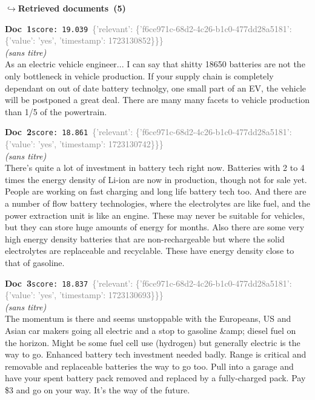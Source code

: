 \documentclass[a4paper,11pt]{article}
\begin{document}
\noindent\hfill{\footnotesize\textcolor{doccolor}{\textbf{$\hookrightarrow$\enspace Retrieved documents~(5)}}}
\begin{docenv}
{\footnotesize\textcolor{doccolor}{\textbf{Doc~1}}}\hfill{\tiny\texttt{score:~19.039}}\ {\tiny\textcolor{gray}{\{'relevant': \{'f6ce971c-68d2-4c26-b1c0-477dd28a5181': \{'value': 'yes', 'timestamp': 1723130852\}\}\}}}\\[3pt]
{\small\textit{(sans titre)}}\\[2pt]
\vspace{2pt}
{\footnotesize 
As an electric vehicle engineer... I can say that shitty 18650 batteries are not the only bottleneck in vehicle production. If your supply chain is completely dependant on out of date battery technolgy, one small part of an EV,  the vehicle will be postponed a great deal. There are many many facets to vehicle production than 1/5 of the powertrain.}
\end{docenv}
\begin{docenv}
{\footnotesize\textcolor{doccolor}{\textbf{Doc~2}}}\hfill{\tiny\texttt{score:~18.861}}\ {\tiny\textcolor{gray}{\{'relevant': \{'f6ce971c-68d2-4c26-b1c0-477dd28a5181': \{'value': 'yes', 'timestamp': 1723130742\}\}\}}}\\[3pt]
{\small\textit{(sans titre)}}\\[2pt]
\vspace{2pt}
{\footnotesize 
There's quite a lot of investment in battery tech right now. Batteries with 2 to 4 times the energy density of Li-ion are now in production, though not for sale yet. People are working on fast charging and long life battery tech too.  And there are a number of flow battery technologies, where the electrolytes are like fuel, and the power extraction unit is like an engine. These may never be suitable for vehicles, but they can store huge amounts of energy for months.   Also there are some very high energy density batteries that are non-rechargeable but where the solid electrolytes are replaceable and recyclable. These have energy density close to that of gasoline.}
\end{docenv}
\begin{docenv}
{\footnotesize\textcolor{doccolor}{\textbf{Doc~3}}}\hfill{\tiny\texttt{score:~18.837}}\ {\tiny\textcolor{gray}{\{'relevant': \{'f6ce971c-68d2-4c26-b1c0-477dd28a5181': \{'value': 'yes', 'timestamp': 1723130693\}\}\}}}\\[3pt]
{\small\textit{(sans titre)}}\\[2pt]
\vspace{2pt}
{\footnotesize 
The momentum is there and seems unstoppable with the Europeans, US and Asian car makers going all electric and a stop to gasoline \&amp; diesel fuel on the horizon.  Might be some fuel cell use (hydrogen) but generally electric is the way to go.  Enhanced battery tech investment needed badly.  Range is critical and removable and replaceable batteries the way to go too.  Pull into a garage and have your spent battery pack removed and replaced by a fully-charged pack.  Pay \$3 and go on your way.  It's the way of the future.}
\end{docenv}
\end{document}
